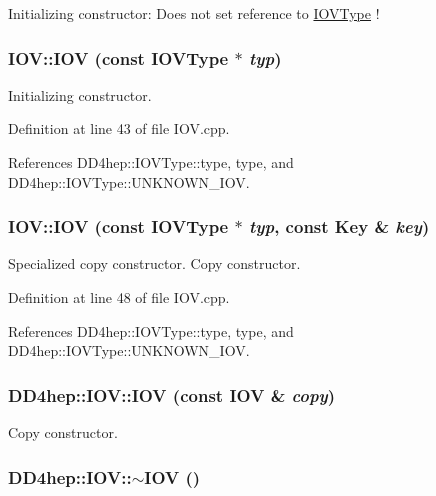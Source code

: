 Initializing constructor: Does not set reference to \hyperlink{class_d_d4hep_1_1_i_o_v_type}{IOVType} ! \hypertarget{class_d_d4hep_1_1_i_o_v_a0a32eb684174feeec7047c7fe4d351cb}{
\subsubsection[{IOV}]{\setlength{\rightskip}{0pt plus 5cm}IOV::IOV (const {\bf IOVType} $\ast$ {\em typ})}}
\label{class_d_d4hep_1_1_i_o_v_a0a32eb684174feeec7047c7fe4d351cb}


Initializing constructor. 

Definition at line 43 of file IOV.cpp.

References DD4hep::IOVType::type, type, and DD4hep::IOVType::UNKNOWN\_\-IOV.\hypertarget{class_d_d4hep_1_1_i_o_v_a1744cedccf7a479d152c842f7fc5220a}{
\subsubsection[{IOV}]{\setlength{\rightskip}{0pt plus 5cm}IOV::IOV (const {\bf IOVType} $\ast$ {\em typ}, \/  const {\bf Key} \& {\em key})}}
\label{class_d_d4hep_1_1_i_o_v_a1744cedccf7a479d152c842f7fc5220a}


Specialized copy constructor. Copy constructor. 

Definition at line 48 of file IOV.cpp.

References DD4hep::IOVType::type, type, and DD4hep::IOVType::UNKNOWN\_\-IOV.\hypertarget{class_d_d4hep_1_1_i_o_v_aa10ef137157d26b5af800d45ed69fcab}{
\subsubsection[{IOV}]{\setlength{\rightskip}{0pt plus 5cm}DD4hep::IOV::IOV (const {\bf IOV} \& {\em copy})}}
\label{class_d_d4hep_1_1_i_o_v_aa10ef137157d26b5af800d45ed69fcab}


Copy constructor. \hypertarget{class_d_d4hep_1_1_i_o_v_ae9f9e2f904e4d89e13615ddd03e365ba}{
\subsubsection[{$\sim$IOV}]{\setlength{\rightskip}{0pt plus 5cm}DD4hep::IOV::$\sim$IOV ()}}
\label{class_d_d4hep_1_1_i_o_v_ae9f9e2f904e4d89e13615ddd03e365ba}


